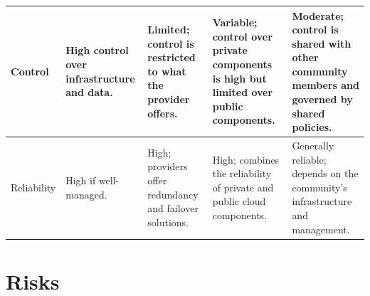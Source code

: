 \begin{longtable}{|p{2cm}| p{3cm} |p{3cm} |p{3cm}|p{3cm}|}
\hline
Control & High control over infrastructure and data. & Limited; control is restricted to what the provider offers. & Variable; control over private components is high but limited over public components. & Moderate; control is shared with other community members and governed by shared policies. \\
\hline
Reliability & High if well-managed. & High; providers offer redundancy and failover solutions. & High; combines the reliability of private and public cloud components. & Generally reliable; depends on the community's infrastructure and management. \\
\hline
\end{longtable}
\endgroup

\section{Risks}
